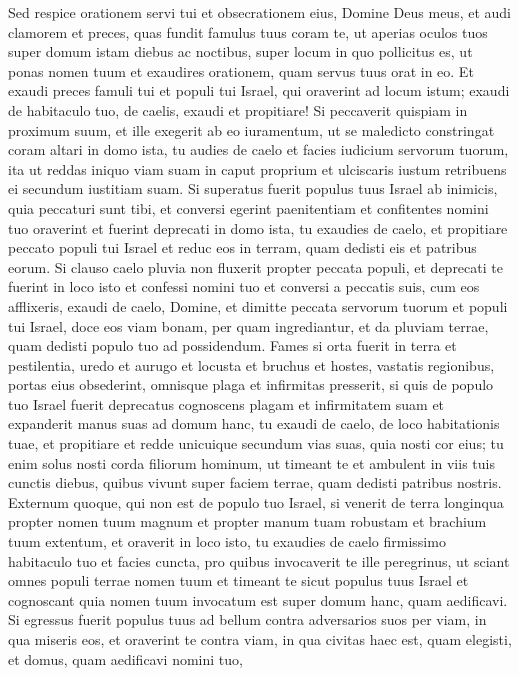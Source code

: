\begin{biblechapter}
\begin{biblechapter}
\begin{biblechapter}
\begin{biblechapter}
\begin{biblechapter}
\begin{biblechapter}
 \verse Sed respice orationem servi tui et obsecrationem eius, Domine Deus meus, et audi clamorem et preces, quas fundit famulus tuus coram te, 
\verse ut aperias oculos tuos super domum istam diebus ac noctibus, super locum in quo pollicitus es, ut ponas nomen tuum et exaudires orationem, quam servus tuus orat in eo. 
 \verse Et exaudi preces famuli tui et populi tui Israel, qui oraverint ad locum istum; exaudi de habitaculo tuo, de caelis, exaudi et propitiare!
 \verse Si peccaverit quispiam in proximum suum, et ille exegerit ab eo iuramentum, ut se maledicto constringat coram altari in domo ista, 
\verse tu audies de caelo et facies iudicium servorum tuorum, ita ut reddas iniquo viam suam in caput proprium et ulciscaris iustum retribuens ei secundum iustitiam suam.
 \verse Si superatus fuerit populus tuus Israel ab inimicis, quia peccaturi sunt tibi, et conversi egerint paenitentiam et confitentes nomini tuo oraverint et fuerint deprecati in domo ista, 
\verse tu exaudies de caelo, et propitiare peccato populi tui Israel et reduc eos in terram, quam dedisti eis et patribus eorum.
 \verse Si clauso caelo pluvia non fluxerit propter peccata populi, et deprecati te fuerint in loco isto et confessi nomini tuo et conversi a peccatis suis, cum eos afflixeris, 
\verse exaudi de caelo, Domine, et dimitte peccata servorum tuorum et populi tui Israel, doce eos viam bonam, per quam ingrediantur, et da pluviam terrae, quam dedisti populo tuo ad possidendum.
 \verse Fames si orta fuerit in terra et pestilentia, uredo et aurugo et locusta et bruchus et hostes, vastatis regionibus, portas eius obsederint, omnisque plaga et infirmitas presserit, 
\verse si quis de populo tuo Israel fuerit deprecatus cognoscens plagam et infirmitatem suam et expanderit manus suas ad domum hanc, 
\verse tu exaudi de caelo, de loco habitationis tuae, et propitiare et redde unicuique secundum vias suas, quia nosti cor eius; tu enim solus nosti corda filiorum hominum, 
\verse ut timeant te et ambulent in viis tuis cunctis diebus, quibus vivunt super faciem terrae, quam dedisti patribus nostris.
 \verse Externum quoque, qui non est de populo tuo Israel, si venerit de terra longinqua propter nomen tuum magnum et propter manum tuam robustam et brachium tuum extentum, et oraverit in loco isto, 
\verse tu exaudies de caelo firmissimo habitaculo tuo et facies cuncta, pro quibus invocaverit te ille peregrinus, ut sciant omnes populi terrae nomen tuum et timeant te sicut populus tuus Israel et cognoscant quia nomen tuum invocatum est super domum hanc, quam aedificavi.
 \verse Si egressus fuerit populus tuus ad bellum contra adversarios suos per viam, in qua miseris eos, et oraverint te contra viam, in qua civitas haec est, quam elegisti, et domus, quam aedificavi nomini tuo, 

\end{biblechapter}
\end{biblechapter}
\end{biblechapter}
\end{biblechapter}
\end{biblechapter}
\end{biblechapter}
